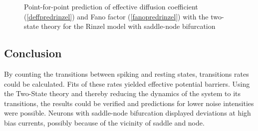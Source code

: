 \documentclass[12pt,a4paper]{article}
\begin{document}
\begin{figure}[H]
	\hspace*{-0.5cm}
	\caption{Point-for-point prediction of effective diffusion coefficient (\ref{deffpredrinzel}) and Fano factor (\ref{fanopredrinzel}) with the two-state theory for the Rinzel model with saddle-node bifurcation}
\end{figure}
\subsection{Conclusion}
By counting the transitions between spiking and resting states, transitions rates could be calculated. Fits of these rates yielded effective potential barriers. Using the Two-State theory and thereby reducing the dynamics of the system to its transitions, the results could be verified and predictions for lower noise intensities were possible. Neurons with saddle-node bifurcation displayed deviations at high bias currents, possibly because of the vicinity of saddle and node.  
\newpage
\end{document}
